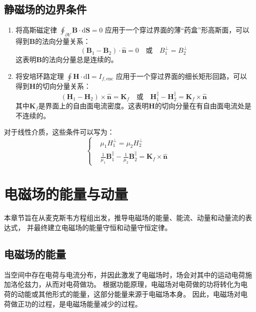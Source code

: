 \documentclass[fontset=none]{ctexart}
\begin{document}
\subsection{静磁场的边界条件}
\begin{enumerate}
    \item 将高斯磁定律 $\oint_{\partial V} \bm{B} \cdot \mathrm{d}\bm{S} = 0$ 
    应用于一个穿过界面的薄“药盒”形高斯面，可以得到$\bm{B}$的法向分量关系：
    \begin{equation}
        (\bm{B}_1 - \bm{B}_2) \cdot \hat{\bm{n}} = 0 \quad \text{或} \quad B_{1}^{\perp} = B_{2}^{\perp}
    \end{equation}
    这表明$\bm{B}$的法向分量总是连续的。
    \item 将安培环路定理 $\oint \bm{H} \cdot \mathrm{d}\bm{l} = I_{f, \text{enc}}$ 
    应用于一个穿过界面的细长矩形回路，可以得到$\bm{H}$的切向分量关系：
    \begin{equation}
        (\bm{H}_1 - \bm{H}_2) \times \hat{\bm{n}} = \bm{K}_f \quad \text{或} \quad \bm{H}_{1}^{\parallel} - \bm{H}_{2}^{\parallel} = \bm{K}_f \times \hat{\bm{n}}
    \end{equation}
    其中$\bm{K}_f$是界面上的自由面电流密度。这表明$\bm{H}$的切向分量在有自由面电流处是不连续的。
\end{enumerate}
对于线性介质，这些条件可以写为：
\begin{equation}
    \left\{
    \begin{aligned}
    &\mu_1 H_{1}^{\perp} = \mu_2 H_{2}^{\perp} \\
    &\frac{1}{\mu_1} \bm{B}_{1}^{\parallel} - \frac{1}{\mu_2} \bm{B}_{2}^{\parallel} 
    = \bm{K}_f \times \hat{\bm{n}}
    \end{aligned}
    \right.
\end{equation}

\section{电磁场的能量与动量}
本章节旨在从麦克斯韦方程组出发，推导电磁场的能量、能流、动量和动量流的表达式，
并最终建立电磁场的能量守恒和动量守恒定律。

\subsection{电磁场的能量}

当空间中存在电荷与电流分布，并因此激发了电磁场时，场会对其中的运动电荷施加洛伦兹力，从而对电荷做功。
根据功能原理，电磁场对电荷做的功将转化为电荷的动能或其他形式的能量，这部分能量来源于电磁场本身。
因此，电磁场对电荷做正功的过程，是电磁场能量减少的过程。
\end{document}
